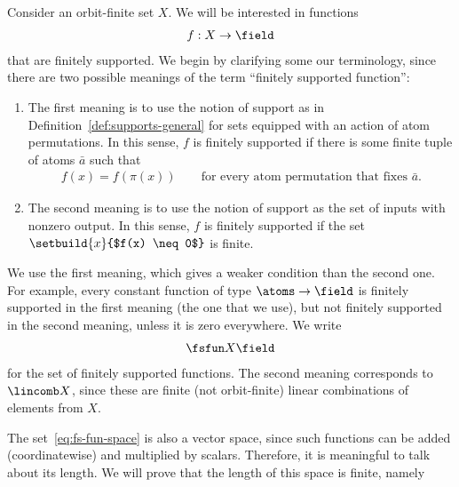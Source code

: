 	 
    Consider an orbit-finite set $X$. We will be interested in functions
    \begin{align*}
    f : X \to \field
    \end{align*}
    that are finitely supported. We begin by clarifying some our terminology, since there are two possible meanings of the term ``finitely supported function'':
    \begin{enumerate}
        \item The first meaning is to use the notion of support as in Definition~\ref{def:supports-general} for sets equipped with an action of atom permutations. In this sense, $f$ is finitely supported if  there is some finite tuple of atoms $\bar a$ such that 
        \begin{align*}
        f(x) = f(\pi(x)) \qquad \text{for every atom permutation that fixes $\bar a$}.
        \end{align*}
        \item The second meaning is to use the notion of support as the set of inputs with nonzero output. In this sense, $f$ is finitely supported if the set $\setbuild{ x}{$f(x) \neq 0$}$ is finite.
    \end{enumerate}
    We use the first meaning, which gives a weaker condition than the second one. For example, every constant function of type $\atoms \to \field$ is finitely supported in the first meaning (the one that we use), but not finitely supported in the second meaning,  unless it is zero everywhere. We write 
    \begin{align}
        \label{eq:fs-fun-space}
    \fsfun X \field
    \end{align}
    for the set of finitely supported functions. The second meaning corresponds to $\lincomb X$, since these are finite (not orbit-finite) linear combinations of elements from $X$. 

    The set~\eqref{eq:fs-fun-space} is also a vector space, since such functions can be added (coordinatewise) and multiplied by scalars. Therefore, it is meaningful to talk about its length. We will prove that the length of this space is finite, namely 